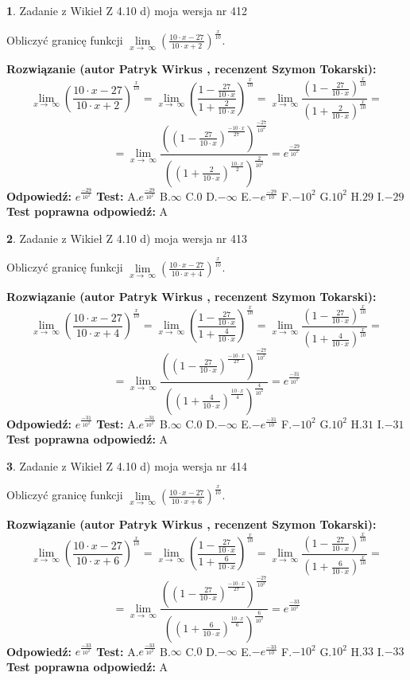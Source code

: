 \documentclass[12pt, a4paper]{article}
\theoremstyle{definition} %
\newtheorem{zad}{}
\newcommand{\zadStart}[1]{\begin{zad}#1\newline}
\newcommand{\zadStop}{\end{zad}}
\newcommand{\rozwStart}[2]{\noindent \textbf{Rozwiązanie (autor #1 , recenzent #2): }\newline}
\newcommand{\rozwStop}{\newline}
\newcommand{\odpStart}{\noindent \textbf{Odpowiedź:}\newline}
\newcommand{\odpStop}{\newline}
\newcommand{\testStart}{\noindent \textbf{Test:}\newline}
\newcommand{\testStop}{\newline}
\newcommand{\kluczStart}{\noindent \textbf{Test poprawna odpowiedź:}\newline}
\newcommand{\kluczStop}{\newline}
\begin{document}
\zadStart{Zadanie z Wikieł Z 4.10 d) moja wersja nr 412}


Obliczyć granicę funkcji  $\lim\limits_{x\to\ \infty}(\frac{10\cdot x-27}{10\cdot x+2})^{\frac{x}{10}}$.
\zadStop
\rozwStart{Patryk Wirkus}{Szymon Tokarski}
$$\lim\limits_{x\to\ \infty}(\frac{10\cdot x-27}{10\cdot x+2})^{\frac{x}{10}} = \lim\limits_{x\to\ \infty}(\frac{1-\frac{27}{10\cdot x}}{1+\frac{2}{10\cdot x}})^{\frac{x}{10}}=\lim\limits_{x\to\ \infty}\frac{(1-\frac{27}{10\cdot x})^{\frac{x}{10}}}{(1+\frac{2}{10\cdot x})^{\frac{x}{10}}}=$$
$$=\lim\limits_{x\to\ \infty}\frac{((1-\frac{27}{10\cdot x})^{\frac{-10\cdot x}{27}})^{\frac{-27}{10^{2}}}}{((1+\frac{2}{10\cdot x})^{\frac{10\cdot x}{2}})^{\frac{2}{10^{2}}}}=e^{\frac{-29}{10^{2}}}$$
\rozwStop
\odpStart
$e^{\frac{-29}{10^{2}}}$
\odpStop
\testStart
A.$e^{\frac{-29}{10^{2}}}$ B.$\infty$ C.$0$ D.$-\infty$ E.$-e^{\frac{-29}{10}}$
F.$-10^{2}$ G.$10^{2}$
H.$29$
I.$-29$
\testStop
\kluczStart
A
\kluczStop



\zadStart{Zadanie z Wikieł Z 4.10 d) moja wersja nr 413}


Obliczyć granicę funkcji  $\lim\limits_{x\to\ \infty}(\frac{10\cdot x-27}{10\cdot x+4})^{\frac{x}{10}}$.
\zadStop
\rozwStart{Patryk Wirkus}{Szymon Tokarski}
$$\lim\limits_{x\to\ \infty}(\frac{10\cdot x-27}{10\cdot x+4})^{\frac{x}{10}} = \lim\limits_{x\to\ \infty}(\frac{1-\frac{27}{10\cdot x}}{1+\frac{4}{10\cdot x}})^{\frac{x}{10}}=\lim\limits_{x\to\ \infty}\frac{(1-\frac{27}{10\cdot x})^{\frac{x}{10}}}{(1+\frac{4}{10\cdot x})^{\frac{x}{10}}}=$$
$$=\lim\limits_{x\to\ \infty}\frac{((1-\frac{27}{10\cdot x})^{\frac{-10\cdot x}{27}})^{\frac{-27}{10^{2}}}}{((1+\frac{4}{10\cdot x})^{\frac{10\cdot x}{4}})^{\frac{4}{10^{2}}}}=e^{\frac{-31}{10^{2}}}$$
\rozwStop
\odpStart
$e^{\frac{-31}{10^{2}}}$
\odpStop
\testStart
A.$e^{\frac{-31}{10^{2}}}$ B.$\infty$ C.$0$ D.$-\infty$ E.$-e^{\frac{-31}{10}}$
F.$-10^{2}$ G.$10^{2}$
H.$31$
I.$-31$
\testStop
\kluczStart
A
\kluczStop



\zadStart{Zadanie z Wikieł Z 4.10 d) moja wersja nr 414}


Obliczyć granicę funkcji  $\lim\limits_{x\to\ \infty}(\frac{10\cdot x-27}{10\cdot x+6})^{\frac{x}{10}}$.
\zadStop
\rozwStart{Patryk Wirkus}{Szymon Tokarski}
$$\lim\limits_{x\to\ \infty}(\frac{10\cdot x-27}{10\cdot x+6})^{\frac{x}{10}} = \lim\limits_{x\to\ \infty}(\frac{1-\frac{27}{10\cdot x}}{1+\frac{6}{10\cdot x}})^{\frac{x}{10}}=\lim\limits_{x\to\ \infty}\frac{(1-\frac{27}{10\cdot x})^{\frac{x}{10}}}{(1+\frac{6}{10\cdot x})^{\frac{x}{10}}}=$$
$$=\lim\limits_{x\to\ \infty}\frac{((1-\frac{27}{10\cdot x})^{\frac{-10\cdot x}{27}})^{\frac{-27}{10^{2}}}}{((1+\frac{6}{10\cdot x})^{\frac{10\cdot x}{6}})^{\frac{6}{10^{2}}}}=e^{\frac{-33}{10^{2}}}$$
\rozwStop
\odpStart
$e^{\frac{-33}{10^{2}}}$
\odpStop
\testStart
A.$e^{\frac{-33}{10^{2}}}$ B.$\infty$ C.$0$ D.$-\infty$ E.$-e^{\frac{-33}{10}}$
F.$-10^{2}$ G.$10^{2}$
H.$33$
I.$-33$
\testStop
\kluczStart
A
\kluczStop
\end{document}
